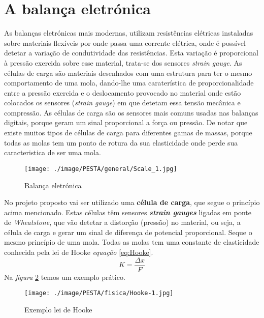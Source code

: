 \section{A balança eletrónica}
As balanças eletrónicas mais modernas, utilizam resistências elétricas instaladas sobre materiais flexíveis por onde passa uma corrente elétrica, onde é possível detetar a variação de condutividade das resistências. Esta variação é proporcional à pressão exercida sobre esse material, trata-se dos sensores \textit{strain gauge}. As células de carga são materiais desenhados com uma estrutura para ter o mesmo comportamento de uma mola, dando-lhe uma caraterística de proporcionalidade entre a pressão exercida e o deslocamento provocado no material onde estão colocados os sensores (\textit{strain gauge}) em que detetam essa tensão mecânica e compressão. As células de carga são os sensores mais comuns usadas nas balanças digitais, porque geram um sinal proporcional a força ou pressão. De notar que existe muitos tipos de células de carga para diferentes gamas de massas, porque todas as molas tem um ponto de rotura da sua elasticidade onde perde sua caracteristica de ser uma mola.
\\
\begin{figure}[H]
	\centering
	\texttt{[image: ./image/PESTA/general/Scale\_1.jpg]}
	\caption{Balança eletrónica}
	\label{Scale_1}
\end{figure}
No projeto proposto vai ser utilizado uma \textbf{célula de carga}, que segue o princípio acima mencionado. Estas células têm sensores \textit{\textbf{strain gauges}} ligadas em ponte de \textit{Wheatstone}, que vão detetar a distorção (pressão) no material, ou seja, a célula de carga e gerar um sinal de diferença de potencial proporcional. Seque o mesmo princípio de uma mola. Todas as molas tem uma constante de elasticidade conhecida pela lei de Hooke \cite{book-3} \textit{equação} \ref{eq:Hooke}.\\
\begin{equation}
	\label{eq:Hooke}
	K = \frac{\Delta x}{F}
\end{equation}
Na \textit{figura} \ref{Hooke-1} temos um exemplo prático.
\begin{figure}[H]
	\centering
	\texttt{[image: ./image/PESTA/fisica/Hooke-1.jpg]}
	\caption{Exemplo lei de Hooke \cite{book-3}}
	\label{Hooke-1}
\end{figure}
